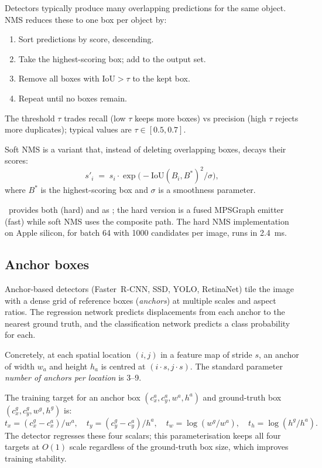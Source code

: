 Detectors typically produce many overlapping predictions for the
same object. NMS reduces these to one box per object by:

\begin{enumerate}
  \item Sort predictions by score, descending.
  \item Take the highest-scoring box; add to the output set.
  \item Remove all boxes with $\mathrm{IoU} > \tau$ to the kept
    box.
  \item Repeat until no boxes remain.
\end{enumerate}

The threshold $\tau$ trades recall (low $\tau$ keeps more boxes)
vs precision (high $\tau$ rejects more duplicates); typical
values are $\tau \in [0.5, 0.7]$.

Soft NMS is a variant that, instead of deleting overlapping
boxes, decays their scores:
\[
  s'_i \;=\; s_i \cdot \exp\bigl(-\mathrm{IoU}(B_i, B^*)^2 / \sigma\bigr),
\]
where $B^*$ is the highest-scoring box and $\sigma$ is a
smoothness parameter.

\Lucid\ provides both  (hard) and
 as ; the hard
version is a fused MPSGraph emitter (fast) while soft NMS uses
the composite path. The hard NMS implementation on Apple
silicon, for batch 64 with 1000 candidates per image, runs in
\SI{2.4}{\milli\second}.

\subsection{Anchor boxes}
\label{ssec:detection_segmentation:anchors}

Anchor-based detectors (Faster~R-CNN, SSD, YOLO, RetinaNet) tile
the image with a dense grid of reference boxes (\emph{anchors})
at multiple scales and aspect ratios. The regression network
predicts displacements from each anchor to the nearest ground
truth, and the classification network predicts a class
probability for each.

Concretely, at each spatial location $(i, j)$ in a feature map
of stride $s$, an anchor of width $w_a$ and height $h_a$ is
centred at $(i \cdot s, j \cdot s)$. The standard parameter
\emph{number of anchors per location} is 3--9.

The training target for an anchor box $(c_x^a, c_y^a, w^a, h^a)$
and ground-truth box $(c_x^g, c_y^g, w^g, h^g)$ is:
\[
  t_x = (c_x^g - c_x^a)/w^a, \quad
  t_y = (c_y^g - c_y^a)/h^a, \quad
  t_w = \log(w^g/w^a), \quad
  t_h = \log(h^g/h^a).
\]
The detector regresses these four scalars; this parameterisation
keeps all four targets at $O(1)$ scale regardless of the
ground-truth box size, which improves training stability.

